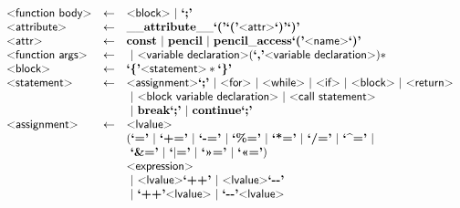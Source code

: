\begin{figure}[h!]
\[\begin{array}{lcl}
  \text{\sf\textless function body\textgreater} & \gets & \text{\sf\textless block\textgreater} ~|~ \text{\bf`;'}\\

  \text{\sf\textless attribute\textgreater} & \gets & \mathbf{\_\_attribute\_\_} \text{\bf`('}\text{\bf`('} \text{\sf\textless attr\textgreater} \text{\bf`)'}\text{\bf`)'}\\

  \text{\sf\textless attr\textgreater} & \gets & \mathbf{const} 
                          ~|~ \mathbf{pencil} 
                          ~|~\mathbf{pencil\_access} \text{\bf`('} \text{\sf\textless name\textgreater} \text{\bf`)'}
\\

  \text{\sf\textless function args\textgreater} & \gets & ~|~ \text{\sf\textless variable declaration\textgreater} (\text{\bf`,'} \text{\sf\textless variable declaration\textgreater})*\\

  \text{\sf\textless block\textgreater} & \gets & \text{\bf`\{'} \text{\sf\textless statement\textgreater} * \text{\bf`\}'}\\

  \text{\sf\textless statement\textgreater} & \gets & \text{\sf\textless assignment\textgreater} \text{\bf`;'}
                               ~|~ \text{\sf\textless for\textgreater}
                               ~|~ \text{\sf\textless while\textgreater}
                               ~|~ \text{\sf\textless if\textgreater}
                               ~|~ \text{\sf\textless block\textgreater}
                               ~|~ \text{\sf\textless return\textgreater}\\ & &
                               ~|~ \text{\sf\textless block variable declaration\textgreater}
                               ~|~ \text{\sf\textless call statement\textgreater}\\ & &
                               ~|~ \mathbf{break} \text{\bf`;'}
                               ~|~ \mathbf{continue} \text{\bf`;'}
  \\

  \text{\sf\textless assignment\textgreater} & \gets & \text{\sf\textless lvalue\textgreater}\\&& (\text{\bf`='}
                                                        ~|~ \text{\bf`+='}
                                                        ~|~ \text{\bf`-='}
                                                        ~|~ \text{\bf`\%='}
                                                        ~|~ \text{\bf`*='}
                                                        ~|~ \text{\bf`/='}
                                                        ~|~ \text{\bf`\textasciicircum='} ~|~\\ &&
                                                            ~\text{\bf`\&='}
                                                        ~|~ \text{\bf`$|$='}
                                                        ~|~ \text{\bf`\textgreater\textgreater='}
                                                        ~|~ \text{\bf`\textless\textless='})\\&&
                                                         \text{\sf\textless expression\textgreater}\\ & &
                                                      ~|~ \text{\sf\textless lvalue\textgreater} \text{\bf`++'}
                                                      ~|~ \text{\sf\textless lvalue\textgreater} \text{\bf`{-}{-}'}\\&&
                                  ~|~\text{\bf`++'} \text{\sf\textless lvalue\textgreater}
                                  ~|~\text{\bf`{-}{-}'} \text{\sf\textless lvalue\textgreater}\\


\end{array}\]
\end{figure}
